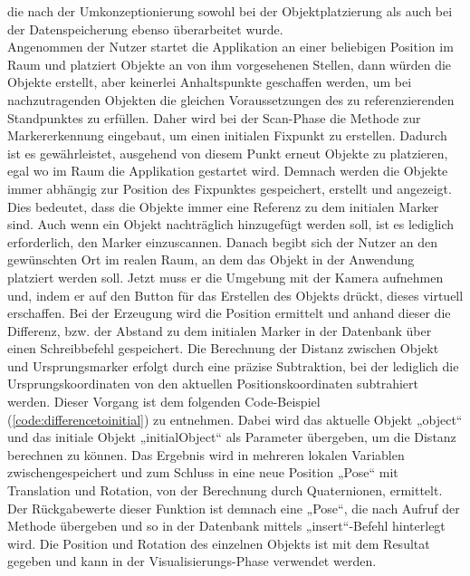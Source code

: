 die nach der Umkonzeptionierung sowohl bei der Objektplatzierung als auch bei der Datenspeicherung ebenso überarbeitet wurde. 
\\ 
\linebreak
Angenommen der Nutzer startet die Applikation an einer beliebigen Position im Raum und platziert Objekte an von ihm vorgesehenen Stellen, dann würden die 
Objekte erstellt, aber keinerlei Anhaltspunkte geschaffen werden, um bei nachzutragenden Objekten die gleichen Voraussetzungen des zu referenzierenden Standpunktes 
zu erfüllen. Daher wird bei der Scan-Phase die Methode zur Markererkennung eingebaut, um einen initialen Fixpunkt zu erstellen. Dadurch ist es gewährleistet, 
ausgehend von diesem Punkt erneut Objekte zu platzieren, egal wo im Raum die Applikation gestartet wird. Demnach werden die Objekte immer abhängig zur Position des 
Fixpunktes gespeichert, erstellt und angezeigt. Dies bedeutet, dass die Objekte immer eine Referenz zu dem initialen Marker sind. Auch wenn 
ein Objekt nachträglich hinzugefügt werden soll, ist es lediglich erforderlich, den Marker einzuscannen. Danach begibt sich der Nutzer an den gewünschten Ort im 
realen Raum, an dem das Objekt in der Anwendung platziert werden soll. Jetzt muss er die Umgebung mit der Kamera aufnehmen und, indem er auf den Button für das 
Erstellen des Objekts drückt, dieses virtuell erschaffen. Bei der Erzeugung wird die Position ermittelt und anhand dieser die Differenz, bzw. der 
Abstand zu dem initialen Marker in der Datenbank über einen Schreibbefehl gespeichert. Die Berechnung der Distanz zwischen Objekt und 
Ursprungsmarker erfolgt durch eine präzise Subtraktion, bei der lediglich die Ursprungskoordinaten von den aktuellen Positionskoordinaten subtrahiert werden. 
Dieser Vorgang ist dem folgenden Code-Beispiel (\ref{code:differencetoinitial}) zu entnehmen. Dabei wird das aktuelle Objekt „object“ und das initiale Objekt 
„initialObject“ als Parameter übergeben, %
um die Distanz berechnen zu können. Das Ergebnis wird in mehreren lokalen Variablen 
zwischengespeichert und zum Schluss in eine neue Position „Pose“ mit Translation und Rotation, von der Berechnung durch Quaternionen, ermittelt. Der Rückgabewerte 
dieser Funktion ist demnach eine „Pose“, die nach Aufruf der Methode übergeben und so in der Datenbank mittels „insert“-Befehl hinterlegt wird. 
Die Position und Rotation des einzelnen Objekts ist mit dem Resultat gegeben und kann in der Visualisierungs-Phase verwendet werden.
\\
